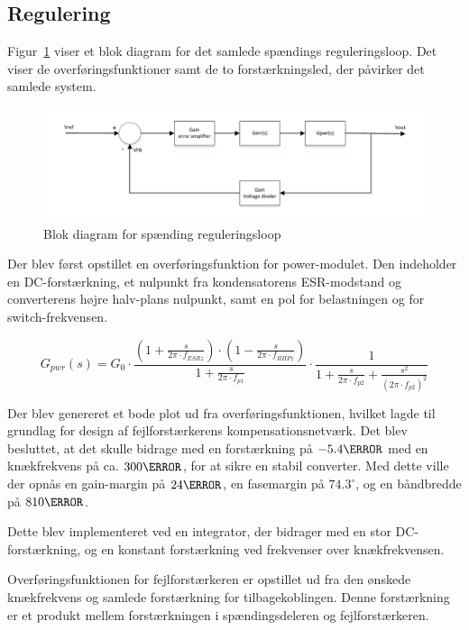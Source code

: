 
\subsection{Regulering}
Figur~\ref{fig:blokdiagram_regulering} viser et blok diagram for det samlede spændings reguleringsloop. Det viser de overføringsfunktioner samt de to forstærkningsled, der påvirker det samlede system.

\begin{figure}[H]
	\centering
	\includegraphics[width=1\linewidth]{../Dokumentation/tex/2iteration/billeder/Regulerings_blokdiagram.pdf}
	\caption{Blok diagram for spænding reguleringsloop}
	\label{fig:blokdiagram_regulering}
\end{figure}

\noindent Der blev først opstillet en overføringsfunktion for power-modulet\cite{UCC1801}. Den indeholder en DC-forstærkning, et nulpunkt fra kondensatorens ESR-modstand og converterens højre halv-plans nulpunkt, samt en pol for belastningen og for switch-frekvensen. 

\begin{equation} \label{H_Power}
G_{pwr}(s) = G_0 \cdot \frac{(1+\frac{s}{2\pi \cdot f_{ESRz}}) \cdot (1-\frac{s}{2\pi \cdot f_{RHPz}})}{1+\frac{s}{2\pi \cdot f_{p1}}} \cdot \frac{1}{1 + \frac{s}{2\pi \cdot f_{p2}} + \frac{s^2}{(2\pi \cdot f_{p2})^2}}
\end{equation}

Der blev genereret et bode plot ud fra overføringsfunktionen, hvilket lagde til grundlag for design af fejlforstærkerens kompensationsnetværk. Det blev besluttet, at det skulle bidrage med en forstærkning på $-5.4\decibel$ med en knækfrekvens på ca. $300\hertz$, for at sikre en stabil converter. Med dette ville der opnås en gain-margin på $24\decibel$, en fasemargin på $74.3^\circ$, og en båndbredde på $810\hertz$.

Dette blev implementeret ved en integrator, der bidrager med en stor DC-forstærkning, og en konstant forstærkning ved frekvenser over knækfrekvensen. 

Overføringsfunktionen for fejlforstærkeren er opstillet ud fra den ønskede knækfrekvens og samlede forstærkning for tilbagekoblingen. Denne forstærkning er et produkt mellem forstærkningen i spændingsdeleren og fejlforstærkeren. 


